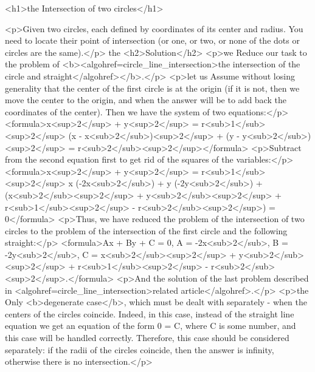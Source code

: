 <h1>the Intersection of two circles</h1>

<p>Given two circles, each defined by coordinates of its center and radius. You need to locate their point of intersection (or one, or two, or none of the dots or circles are the same).</p>
the <h2>Solution</h2>
<p>we Reduce our task to the problem of <b><algohref=circle_line_intersection>the intersection of the circle and straight</algohref></b>.</p>
<p>let us Assume without losing generality that the center of the first circle is at the origin (if it is not, then we move the center to the origin, and when the answer will be to add back the coordinates of the center). Then we have the system of two equations:</p>
<formula>x<sup>2</sup> + y<sup>2</sup> = r<sub>1</sub><sup>2</sup>
(x - x<sub>2</sub>)<sup>2</sup> + (y - y<sub>2</sub>)<sup>2</sup> = r<sub>2</sub><sup>2</sup></formula>
<p>Subtract from the second equation first to get rid of the squares of the variables:</p>
<formula>x<sup>2</sup> + y<sup>2</sup> = r<sub>1</sub><sup>2</sup>
x (-2x<sub>2</sub>) + y (-2y<sub>2</sub>) + (x<sub>2</sub><sup>2</sup> + y<sub>2</sub><sup>2</sup> + r<sub>1</sub><sup>2</sup> - r<sub>2</sub><sup>2</sup>) = 0</formula>
<p>Thus, we have reduced the problem of the intersection of two circles to the problem of the intersection of the first circle and the following straight:</p>
<formula>Ax + By + C = 0,
A = -2x<sub>2</sub>,
B = -2y<sub>2</sub>,
C = x<sub>2</sub><sup>2</sup> + y<sub>2</sub><sup>2</sup> + r<sub>1</sub><sup>2</sup> - r<sub>2</sub><sup>2</sup>.</formula>
<p>And the solution of the last problem described in <algohref=circle_line_intersection>related article</algohref>.</p>
<p>the Only <b>degenerate case</b>, which must be dealt with separately - when the centers of the circles coincide. Indeed, in this case, instead of the straight line equation we get an equation of the form 0 = C, where C is some number, and this case will be handled correctly. Therefore, this case should be considered separately: if the radii of the circles coincide, then the answer is infinity, otherwise there is no intersection.</p>